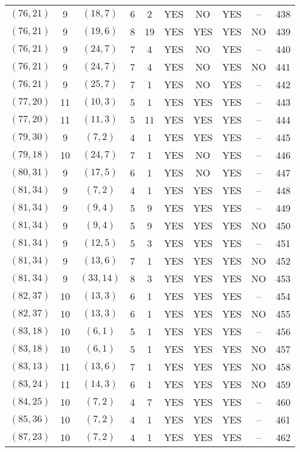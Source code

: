 \begin{longtable}{|c|c|c|c|c|c|c|c|c|c|}
$(76, 21)$ & 9 & $(18, 7)$ & 6 & 2 & YES & NO & YES & -- & 438\\
$(76, 21)$ & 9 & $(19, 6)$ & 8 & 19 & YES & YES & YES & NO & 439\\
$(76, 21)$ & 9 & $(24, 7)$ & 7 & 4 & YES & NO & YES & -- & 440\\
$(76, 21)$ & 9 & $(24, 7)$ & 7 & 4 & YES & NO & YES & NO & 441\\
$(76, 21)$ & 9 & $(25, 7)$ & 7 & 1 & YES & NO & YES & -- & 442\\
$(77, 20)$ & 11 & $(10, 3)$ & 5 & 1 & YES & YES & YES & -- & 443\\
$(77, 20)$ & 11 & $(11, 3)$ & 5 & 11 & YES & YES & YES & -- & 444\\
$(79, 30)$ & 9 & $(7, 2)$ & 4 & 1 & YES & YES & YES & -- & 445\\
$(79, 18)$ & 10 & $(24, 7)$ & 7 & 1 & YES & NO & YES & -- & 446\\
$(80, 31)$ & 9 & $(17, 5)$ & 6 & 1 & YES & NO & YES & -- & 447\\
$(81, 34)$ & 9 & $(7, 2)$ & 4 & 1 & YES & YES & YES & -- & 448\\
$(81, 34)$ & 9 & $(9, 4)$ & 5 & 9 & YES & YES & YES & -- & 449\\
$(81, 34)$ & 9 & $(9, 4)$ & 5 & 9 & YES & YES & YES & NO & 450\\
$(81, 34)$ & 9 & $(12, 5)$ & 5 & 3 & YES & YES & YES & -- & 451\\
$(81, 34)$ & 9 & $(13, 6)$ & 7 & 1 & YES & YES & YES & NO & 452\\
$(81, 34)$ & 9 & $(33, 14)$ & 8 & 3 & YES & YES & YES & NO & 453\\
$(82, 37)$ & 10 & $(13, 3)$ & 6 & 1 & YES & YES & YES & -- & 454\\
$(82, 37)$ & 10 & $(13, 3)$ & 6 & 1 & YES & YES & YES & NO & 455\\
$(83, 18)$ & 10 & $(6, 1)$ & 5 & 1 & YES & YES & YES & -- & 456\\
$(83, 18)$ & 10 & $(6, 1)$ & 5 & 1 & YES & YES & YES & NO & 457\\
$(83, 13)$ & 11 & $(13, 6)$ & 7 & 1 & YES & YES & YES & NO & 458\\
$(83, 24)$ & 11 & $(14, 3)$ & 6 & 1 & YES & YES & YES & NO & 459\\
$(84, 25)$ & 10 & $(7, 2)$ & 4 & 7 & YES & YES & YES & -- & 460\\
$(85, 36)$ & 10 & $(7, 2)$ & 4 & 1 & YES & YES & YES & -- & 461\\
$(87, 23)$ & 10 & $(7, 2)$ & 4 & 1 & YES & YES & YES & -- & 462\\

\end{longtable}
